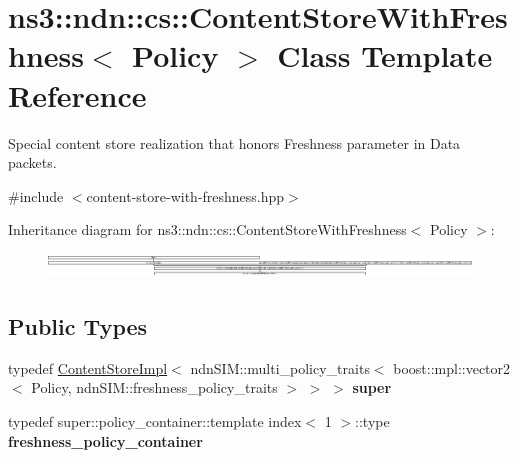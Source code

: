 \hypertarget{classns3_1_1ndn_1_1cs_1_1ContentStoreWithFreshness}{}\section{ns3\+:\+:ndn\+:\+:cs\+:\+:Content\+Store\+With\+Freshness$<$ Policy $>$ Class Template Reference}
\label{classns3_1_1ndn_1_1cs_1_1ContentStoreWithFreshness}


Special content store realization that honors Freshness parameter in Data packets.  




{\ttfamily \#include $<$content-\/store-\/with-\/freshness.\+hpp$>$}

Inheritance diagram for ns3\+:\+:ndn\+:\+:cs\+:\+:Content\+Store\+With\+Freshness$<$ Policy $>$\+:\begin{figure}[H]
\begin{center}
\leavevmode
\includegraphics[height=0.638905cm]{classns3_1_1ndn_1_1cs_1_1ContentStoreWithFreshness}
\end{center}
\end{figure}
\subsection*{Public Types}
\begin{DoxyCompactItemize}
\item 
typedef \hyperlink{classns3_1_1ndn_1_1cs_1_1ContentStoreImpl}{Content\+Store\+Impl}$<$ ndn\+S\+I\+M\+::multi\+\_\+policy\+\_\+traits$<$ boost\+::mpl\+::vector2$<$ Policy, ndn\+S\+I\+M\+::freshness\+\_\+policy\+\_\+traits $>$ $>$ $>$ {\bfseries super}\hypertarget{classns3_1_1ndn_1_1cs_1_1ContentStoreWithFreshness_a2caf4ce9d5a0edadc8fe5951074c3343}{}\label{classns3_1_1ndn_1_1cs_1_1ContentStoreWithFreshness_a2caf4ce9d5a0edadc8fe5951074c3343}

\item 
typedef super\+::policy\+\_\+container\+::template index$<$ 1 $>$\+::type {\bfseries freshness\+\_\+policy\+\_\+container}\hypertarget{classns3_1_1ndn_1_1cs_1_1ContentStoreWithFreshness_a6d0100d1e61a640e42fe8c5538d42210}{}\label{classns3_1_1ndn_1_1cs_1_1ContentStoreWithFreshness_a6d0100d1e61a640e42fe8c5538d42210}

\end{DoxyCompactItemize}
